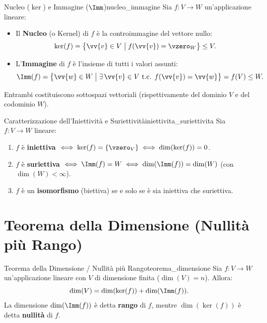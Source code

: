 \begin{definizione}{Nucleo ($\ker$) e Immagine ($\Imm$)}{nucleo_immagine}
Sia $f: V \to W$ un'applicazione lineare:
\begin{itemize}
    \item Il \textbf{Nucleo} (o Kernel) di $f$ è la controimmagine del vettore nullo:
    \begin{equation}
        \ker(f) = \big\{ \vv{v} \in V \;\big|\; f(\vv{v}) = \vzero_W \big\} \le V.
    \end{equation}
    \item L'\textbf{Immagine} di $f$ è l'insieme di tutti i valori assunti:
    \begin{equation}
        \Imm(f) = \big\{ \vv{w} \in W \;\big|\; \exists\, \vv{v} \in V \text{ t.c. } f(\vv{v}) = \vv{w} \big\} = f(V) \le W.
    \end{equation}
\end{itemize}
Entrambi costituiscono sottospazi vettoriali (rispettivamente del dominio $V$ e del codominio $W$).
\end{definizione}

\begin{teorema}{Caratterizzazione dell'Iniettività e Suriettività}{iniettivita_suriettivita}
Sia $f: V \to W$ lineare:
\begin{enumerate}
    \item $f$ è \textbf{iniettiva} $\iff \ker(f) = \{\vzero_V\} \iff \dim(\ker(f)) = 0$.
    \item $f$ è \textbf{suriettiva} $\iff \Imm(f) = W \iff \dim(\Imm(f)) = \dim(W)$ (con $\dim(W) < \infty$).
    \item $f$ è un \textbf{isomorfismo} (biettiva) se e solo se è sia iniettiva che suriettiva.
\end{enumerate}
\end{teorema}

\section{Teorema della Dimensione (Nullità più Rango)}

\begin{teorema}{Teorema della Dimensione / Nullità più Rango}{teorema_dimensione}
Sia $f: V \to W$ un'applicazione lineare con $V$ di dimensione finita ($\dim(V) = n$). Allora:
\begin{equation}
    \dim(V) = \dim(\ker(f)) + \dim(\Imm(f)).
\end{equation}
La dimensione $\dim(\Imm(f))$ è detta \textbf{rango} di $f$, mentre $\dim(\ker(f))$ è detta \textbf{nullità} di $f$.
\end{teorema}

